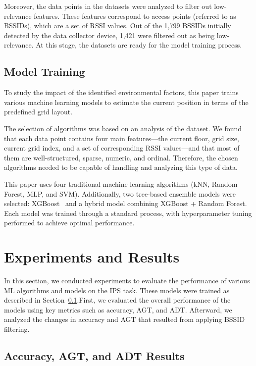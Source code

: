 \documentclass[runningheads]{llncs}
\begin{document}
Moreover, the data points in the datasets were analyzed to filter out low-relevance features. These features correspond to access points (referred to as BSSIDs), which are a set of RSSI values. Out of the 1,799 BSSIDs initially detected by the data collector device, 1,421 were filtered out as being low-relevance. At this stage, the datasets are ready for the model training process.

\subsection{Model Training}\label{ssec:training}

To study the impact of the identified environmental factors, this paper trains various machine learning models to estimate the current position in terms of the predefined grid layout.

The selection of algorithms was based on an analysis of the dataset. We found that each data point contains four main features—the current floor, grid size, current grid index, and a set of corresponding RSSI values—and that most of them are well-structured, sparse, numeric, and ordinal. Therefore, the chosen algorithms needed to be capable of handling and analyzing this type of data.

This paper uses four traditional machine learning algorithms (kNN, Random Forest, MLP, and SVM). Additionally, two tree-based ensemble models were selected: XGBoost~\cite{add2} and a hybrid model combining XGBoost + Random Forest. Each model was trained through a standard process, with hyperparameter tuning performed to achieve optimal performance.

\section{Experiments and Results}\label{sec:experiment-results}

In this section, we conducted experiments to evaluate the performance of various ML algorithms and models on the IPS task. These models were trained as described in Section~\ref{ssec:training}.First, we evaluated the overall performance of the models using key metrics such as accuracy, AGT, and ADT. Afterward, we analyzed the changes in accuracy and AGT that resulted from applying BSSID filtering.

\subsection{Accuracy, AGT, and ADT Results}\label{ssec:acc-agt-adt-results}
\end{document}
